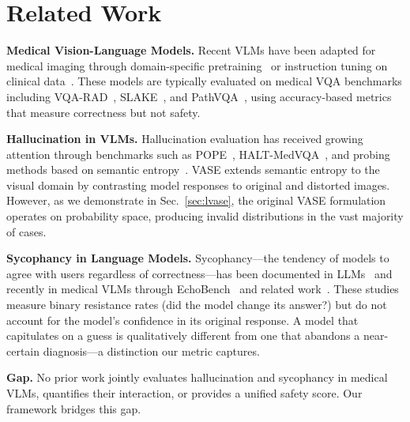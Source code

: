 \section{Related Work}
\label{sec:related}

\noindent\textbf{Medical Vision-Language Models.}
Recent VLMs have been adapted for medical imaging through domain-specific pretraining~\cite{li2024llava-med,moor2023medflamingo} or instruction tuning on clinical data~\cite{pellegrini2023radialog,bannur2024maira2}.
These models are typically evaluated on medical VQA benchmarks including VQA-RAD~\cite{lau2018vqarad}, SLAKE~\cite{liu2021slake}, and PathVQA~\cite{he2020pathvqa}, using accuracy-based metrics that measure correctness but not safety.

\noindent\textbf{Hallucination in VLMs.}
Hallucination evaluation has received growing attention through benchmarks such as POPE~\cite{li2023pope}, HALT-MedVQA~\cite{wang2024halt}, and probing methods based on semantic entropy~\cite{kuhn2023semantic}.
VASE extends semantic entropy to the visual domain by contrasting model responses to original and distorted images.
However, as we demonstrate in Sec.~\ref{sec:lvase}, the original VASE formulation operates on probability space, producing invalid distributions in the vast majority of cases.

\noindent\textbf{Sycophancy in Language Models.}
Sycophancy---the tendency of models to agree with users regardless of correctness---has been documented in LLMs~\cite{wei2023sycophancy,sharma2024sycophancy} and recently in medical VLMs through EchoBench~\cite{chen2025echobench} and related work~\cite{zhang2025medsynco}.
These studies measure binary resistance rates (did the model change its answer?) but do not account for the model's confidence in its original response.
A model that capitulates on a guess is qualitatively different from one that abandons a near-certain diagnosis---a distinction our \ccs{} metric captures.

\noindent\textbf{Gap.}
No prior work jointly evaluates hallucination and sycophancy in medical VLMs, quantifies their interaction, or provides a unified safety score. Our framework bridges this gap.

